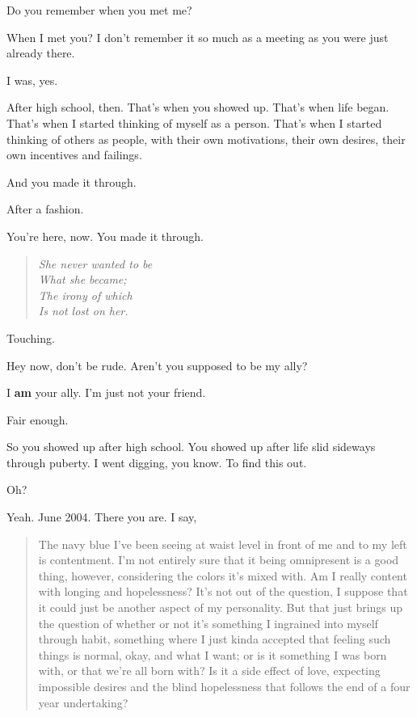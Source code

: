 \begin{paracol}{2}
  \begin{leftcolumn}

\begin{ally}
Do you remember when you met me?
\end{ally}
When I met you? I don't remember it so much as a meeting as you were just already there.

\begin{ally}
I was, yes.
\end{ally}
After high school, then. That's when you showed up. That's when life began. That's when I started thinking of myself as a person. That's when I started thinking of others as people, with their own motivations, their own desires, their own incentives and failings.

\begin{ally}
And you made it through.
\end{ally}
After a fashion.

\begin{ally}
You're here, now. You made it through.
\end{ally}
\begin{verse}
\emph{She never wanted to be\\
\vin What she became;\\
\vin \vin The irony of which\\
\vin \vin \vin Is not lost on her.}
\end{verse}

\begin{ally}
Touching.
\end{ally}
Hey now, don't be rude. Aren't you supposed to be my ally?

\begin{ally}
I \textbf{am} your ally. I'm just not your friend.
\end{ally}
Fair enough.

So you showed up after high school. You showed up after life slid sideways through puberty. I went digging, you know. To find this out.

\begin{ally}
Oh?
\end{ally}
Yeah. June 2004. There you are. I say,

\begin{quotation}
The navy blue I've been seeing at waist level in front of me and to my left is contentment. I'm not entirely sure that it being omnipresent is a good thing, however, considering the colors it's mixed with. Am I really content with longing and hopelessness? It's not out of the question, I suppose that it could just be another aspect of my personality. But that just brings up the question of whether or not it's something I ingrained into myself through habit, something where I just kinda accepted that feeling such things is normal, okay, and what I want; or is it something I was born with, or that we're all born with? Is it a side effect of love, expecting impossible desires and the blind hopelessness that follows the end of a four year undertaking?
\end{quotation}


\end{leftcolumn}
\end{paracol}
